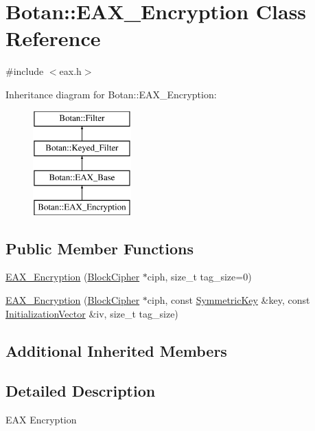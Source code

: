\hypertarget{classBotan_1_1EAX__Encryption}{\section{Botan\-:\-:E\-A\-X\-\_\-\-Encryption Class Reference}
\label{classBotan_1_1EAX__Encryption}
}


{\ttfamily \#include $<$eax.\-h$>$}

Inheritance diagram for Botan\-:\-:E\-A\-X\-\_\-\-Encryption\-:\begin{figure}[H]
\begin{center}
\leavevmode
\includegraphics[height=4.000000cm]{classBotan_1_1EAX__Encryption}
\end{center}
\end{figure}
\subsection*{Public Member Functions}
\begin{DoxyCompactItemize}
\item 
\hyperlink{classBotan_1_1EAX__Encryption_a00fa6655a656a3a74e228fd79455d450}{E\-A\-X\-\_\-\-Encryption} (\hyperlink{classBotan_1_1BlockCipher}{Block\-Cipher} $\ast$ciph, size\-\_\-t tag\-\_\-size=0)
\item 
\hyperlink{classBotan_1_1EAX__Encryption_ae03e11fe8b6b978949a9d12359fb5fcd}{E\-A\-X\-\_\-\-Encryption} (\hyperlink{classBotan_1_1BlockCipher}{Block\-Cipher} $\ast$ciph, const \hyperlink{namespaceBotan_a00c78597211d5c63b63e2a57ddb96d38}{Symmetric\-Key} \&key, const \hyperlink{namespaceBotan_ab6a07e859c4e3a2ccfd68308ec89497e}{Initialization\-Vector} \&iv, size\-\_\-t tag\-\_\-size)
\end{DoxyCompactItemize}
\subsection*{Additional Inherited Members}


\subsection{Detailed Description}
E\-A\-X Encryption 

